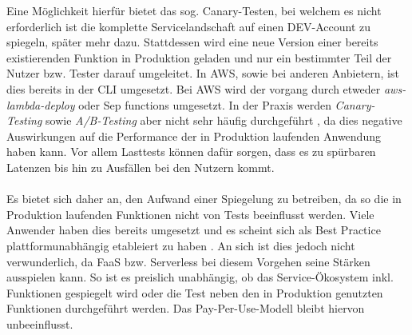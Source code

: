 \documentclass[11pt]{article}
\begin{document}
Eine Möglichkeit hierfür bietet das sog. Canary-Testen, bei welchem es nicht erforderlich ist die komplette Servicelandschaft auf einen DEV-Account zu spiegeln, später mehr dazu. Stattdessen wird eine neue Version einer bereits existierenden Funktion in Produktion geladen und nur ein bestimmter Teil der Nutzer bzw. Tester darauf umgeleitet. In AWS, sowie bei anderen Anbietern, ist dies bereits in der CLI umgesetzt. Bei AWS wird der vorgang durch etweder \textit{aws-lambda-deploy} oder Sep functions umgesetzt. In der Praxis werden \textit{Canary-Testing} sowie \textit{A/B-Testing} aber nicht sehr häufig durchgeführt \cite{leitner2019mixed}, da dies negative Auswirkungen auf die Performance der in Produktion laufenden Anwendung haben kann. Vor allem Lasttests können dafür sorgen, dass es zu spürbaren Latenzen bis hin zu Ausfällen bei den Nutzern kommt. \\\\
Es bietet sich daher an, den Aufwand einer Spiegelung zu betreiben, da so die in Produktion laufenden Funktionen nicht von Tests beeinflusst werden. Viele Anwender haben dies bereits umgesetzt und es scheint sich als \glqq Best Practice\grqq{} plattformunabhängig etableiert zu haben \cite{leitner2019mixed}. An sich ist dies jedoch nicht verwunderlich, da FaaS bzw. Serverless bei diesem Vorgehen seine Stärken ausspielen kann. So ist es preislich unabhängig, ob das Service-Ökosystem inkl. Funktionen gespiegelt wird oder die Test neben den in Produktion genutzten Funktionen durchgeführt werden. Das Pay-Per-Use-Modell bleibt hiervon unbeeinflusst.    
\end{document}
